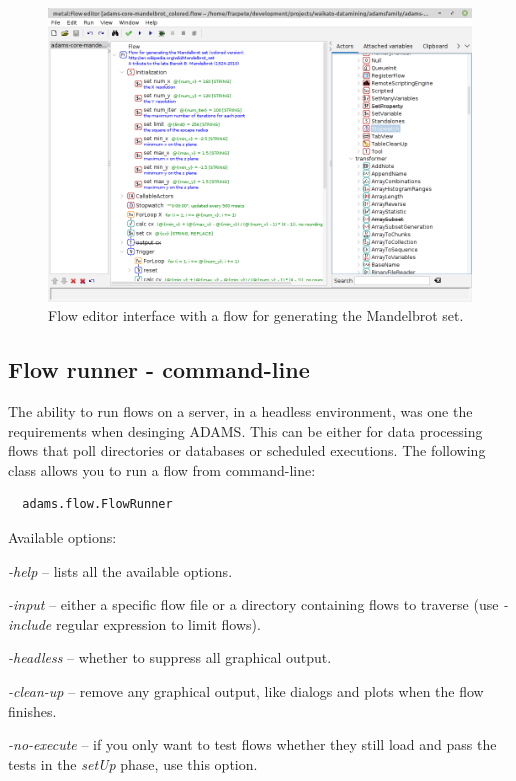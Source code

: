 \begin{figure}[htb]
  \centering
  \includegraphics[width=12.0cm]{images/floweditor-mandelbrot.png}
  \caption{Flow editor interface with a flow for generating the Mandelbrot set.}
  \label{floweditor-mandelbrot}
\end{figure}

\subsection{Flow runner - command-line}
The ability to run flows on a server, in a headless environment, was one the
requirements when desinging ADAMS. This can be either for data processing
flows that poll directories or databases or scheduled executions. The following
class allows you to run a flow from command-line:
\begin{verbatim}
  adams.flow.FlowRunner
\end{verbatim}
Available options:
\begin{tight_itemize}
	\item \textit{-help} -- lists all the available options.
	\item \textit{-input} -- either a specific flow file or a directory containing
	flows to traverse (use \textit{-include} regular expression to limit flows).
	\item \textit{-headless} -- whether to suppress all graphical output.
	\item \textit{-clean-up} -- remove any graphical output, like dialogs and
	plots when the flow finishes.
	\item \textit{-no-execute} -- if you only want to test flows whether they 
	still load and pass the tests in the \textit{setUp} phase, use this option.
\end{tight_itemize}


